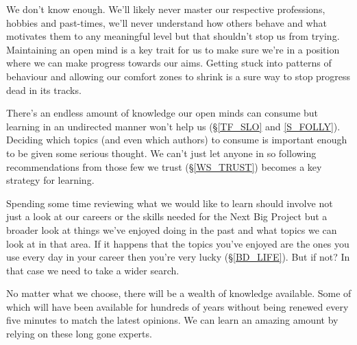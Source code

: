 \cleardoublepage
{\small

We don't know enough. We'll likely never master our respective professions, hobbies and past-times, we'll never understand how others behave and what motivates them to any meaningful level but that shouldn't stop us from trying. Maintaining an open mind is a key trait for us to make sure we're in a position where we can make progress towards our aims. Getting stuck into patterns of behaviour and allowing our comfort zones to shrink is a sure way to stop progress dead in its tracks.

There's an endless amount of knowledge our open minds can consume but learning in an undirected manner won't help us (\S  \ref{TF_SLO} and \ref{S_FOLLY}). 
Deciding which topics (and even which authors) to consume is important enough to be given some serious thought. We can't just let anyone in so following recommendations from those few we trust (\S \ref{WS_TRUST}) becomes a key strategy for learning.

Spending some time reviewing what we would like to learn should involve not just a look at our careers or the skills needed for the Next Big Project but a broader look at things we've enjoyed doing in the past and what topics we can look at in that area. If it happens that the topics you've enjoyed are the ones you use every day in your career then you're very lucky (\S \ref{BD_LIFE}). But if not? In that case we need to take a wider search.

No matter what we choose, there will be a wealth of knowledge available. Some of which will have been available for hundreds of years without being renewed every five minutes to match the latest opinions. We can learn an amazing amount by relying on these long gone experts.

}
